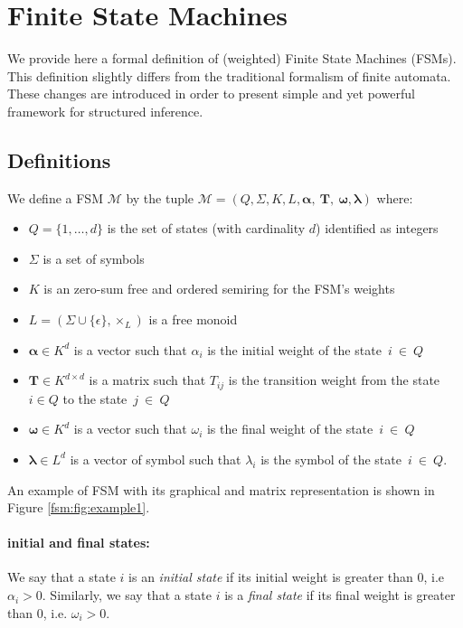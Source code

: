 \section{Finite State Machines}

We provide here a formal definition of (weighted) Finite State Machines
(FSMs). This definition slightly differs from the traditional formalism
of finite automata. These changes are introduced in order to present
simple and yet powerful framework for structured inference.

\subsection{Definitions}

We define a FSM $\mathcal{M}$ by the tuple
$\mathcal{M} = (Q, \Sigma, K, L, \boldsymbol{\alpha},~\mathbf{T},~\boldsymbol{\omega}, \boldsymbol{\lambda})$
where:
\begin{itemize}
    \item $Q = \{1, \dots, d\}$ is the set of states (with cardinality $d$)
        identified as integers
    \item $\Sigma$ is a set of symbols
    \item $K$ is an zero-sum free and ordered semiring for the FSM's weights
    \item $L = (\Sigma \cup \{ \epsilon \}, \times_L)$ is a free monoid
    \item $\boldsymbol{\alpha} \in K^d$ is a vector such that $\alpha_i$
    is the initial weight of the state~$i~\in~Q$
    \item $\mathbf{T} \in K^{d\times d}$ is a matrix such that $T_{ij}$
        is the transition weight from the state $i \in Q$ to the state~$j~\in~Q$
    \item $\boldsymbol{\omega} \in K^d$ is a vector such that $\omega_i$
        is the final weight of the state~$i~\in~Q$
    \item $\boldsymbol{\lambda} \in L^d$ is a vector of symbol such that
        $\lambda_i$ is the symbol of the state~$i~\in~Q$.
\end{itemize}
An example of FSM with its graphical and matrix representation is
shown in Figure \ref{fsm:fig:example1}.

\paragraph{initial and final states:} We say that a state $i$ is an
\emph{initial state} if its initial weight is greater than $0$,
i.e $\alpha_i > 0$. Similarly, we say that a state $i$ is a
\emph{final state} if its final weight is greater than $0$, i.e.
$\omega_i > 0$.

